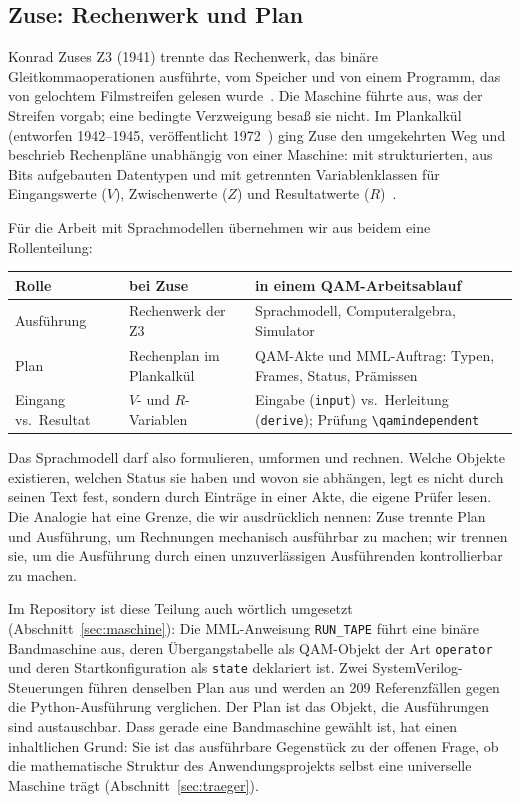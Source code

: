 \subsection{Zuse: Rechenwerk und Plan}

Konrad Zuses Z3 (1941) trennte das Rechenwerk, das binäre Gleitkommaoperationen ausführte, vom Speicher und von einem Programm, das
von gelochtem Filmstreifen gelesen wurde~\cite{rojas}. Die Maschine führte aus, was der Streifen vorgab; eine bedingte Verzweigung
besaß sie nicht. Im Plankalkül (entworfen 1942--1945, veröffentlicht 1972~\cite{zuse72,bauer}) ging Zuse den umgekehrten Weg und
beschrieb Rechenpläne unabhängig von einer Maschine: mit strukturierten, aus Bits aufgebauten Datentypen und mit getrennten
Variablenklassen für Eingangswerte ($V$), Zwischenwerte ($Z$) und Resultatwerte ($R$)~\cite{bauer}.

Für die Arbeit mit Sprachmodellen übernehmen wir aus beidem eine Rollenteilung:
\begin{center}
\begin{tabular}{@{}p{}p{}p{}@{}}
\toprule
Rolle & bei Zuse & in einem QAM-Arbeitsablauf\\
\midrule
Ausführung & Rechenwerk der Z3 & Sprachmodell, Computeralgebra, Simulator\\
Plan & Rechenplan im Plankalkül & QAM-Akte und MML-Auftrag: Typen, Frames, Status, Prämissen\\
Eingang vs.\ Resultat & $V$- und $R$-Variablen & Eingabe (\texttt{input}) vs.\ Herleitung (\texttt{derive}); Prüfung \texttt{\textbackslash qamindependent}\\
\bottomrule
\end{tabular}
\end{center}
Das Sprachmodell darf also formulieren, umformen und rechnen. Welche Objekte existieren, welchen Status sie haben und wovon sie
abhängen, legt es nicht durch seinen Text fest, sondern durch Einträge in einer Akte, die eigene Prüfer lesen. Die Analogie hat
eine Grenze, die wir ausdrücklich nennen: Zuse trennte Plan und Ausführung, um Rechnungen mechanisch ausführbar zu machen; wir
trennen sie, um die Ausführung durch einen unzuverlässigen Ausführenden kontrollierbar zu machen.

Im Repository ist diese Teilung auch wörtlich umgesetzt (Abschnitt~\ref{sec:maschine}): Die MML-Anweisung \texttt{RUN\_TAPE}
führt eine binäre Bandmaschine aus, deren Übergangstabelle als QAM-Objekt der Art \texttt{operator} und deren Startkonfiguration als
\texttt{state} deklariert ist. Zwei SystemVerilog-Steuerungen führen denselben Plan aus und werden an
209 Referenzfällen gegen die Python-Ausführung verglichen. Der Plan ist das Objekt, die Ausführungen sind austauschbar. Dass gerade eine Bandmaschine gewählt ist, hat einen inhaltlichen
Grund: Sie ist das ausführbare Gegenstück zu der offenen Frage, ob die mathematische Struktur des Anwendungsprojekts selbst eine
universelle Maschine trägt (Abschnitt~\ref{sec:traeger}).

